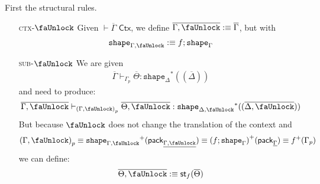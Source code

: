 \documentclass[10pt]{article}
\theoremstyle{definition}
\newcommand{\yields}{\vdash}
\newcommand{\CTX}{\,\,\mathsf{Ctx}}
\newcommand\St[2]{\ensuremath{{#1}^*(#2)}}
\newcommand\StI[2]{\ensuremath{\mathsf{st}_{#1}(#2)}}
\newcommand\TrPlus[2]{\ensuremath{{#1}^+(#2)}}
\newcommand\ctxtuple[1]{(#1)}
\newcommand\pack[1]{\ensuremath{\mathsf{pack}_{#1}}}
\newcommand{\modeof}[1]{{#1}_p}
\newcommand{\tshape}[1]{\ensuremath{\mathtt{shape}_{#1}}}
\newcommand{\upstairs}[1]{\overline{#1}}
\newcommand{\downstairs}[1]{\underline{#1}}
\newcommand{\lock}{\text{\faUnlock}}
\begin{document}
First the structural rules.
\begin{enumerate}
\item[\textsc{ctx-$\lock$}] Given $\yields \upstairs{\Gamma} \CTX$, we define $\upstairs{\Gamma, \lock} :\equiv \upstairs{\Gamma}$, but with
\begin{align*}
\tshape{\Gamma, \lock} :\equiv f ; \tshape{\Gamma}
\end{align*}
%
\item[\textsc{sub-$\lock$}] We are given
\begin{align*}
\upstairs{\Gamma} \yields_{\modeof{\Gamma}} \upstairs{\Theta} : \St{\tshape{\Delta}}{\ctxtuple{\upstairs{\Delta}}}
\end{align*}
and need to produce:
\begin{align*}
\upstairs{\Gamma, \lock} \yields_{\modeof{(\Gamma, \lock)}} \upstairs{\Theta, \lock} : \St{\tshape{\Delta, \lock}}{\ctxtuple{\upstairs{\Delta, \lock}}}
\end{align*}
But because $\lock$ does not change the translation of the context and
\begin{align*}
\modeof{(\Gamma, \lock)} \equiv \TrPlus{\tshape{\Gamma, \lock}}{\pack{\downstairs{\Gamma, \lock}}} \equiv \TrPlus{(f;\tshape{\Gamma})}{\pack{\downstairs{\Gamma}}} \equiv \TrPlus{f}{\modeof{\Gamma}}
\end{align*}
we can define:
\begin{align*}
\upstairs{\Theta, \lock} :\equiv \StI{f}{\upstairs{\Theta}}
\end{align*}
\end{enumerate}
\end{document}
